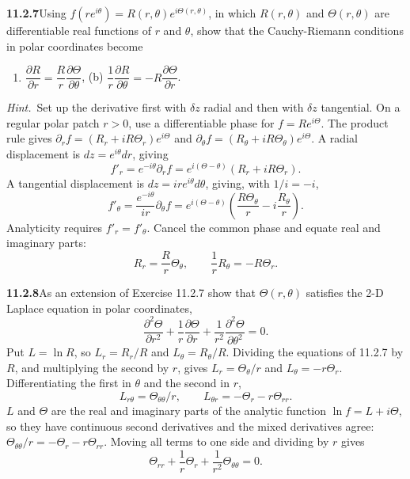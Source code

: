 \par\bigskip
\noindent\textbf{11.2.7}\quad Using $f(re^{i\theta})=R(r,\theta)e^{i\Theta(r,\theta)}$,
in which $R(r,\theta)$ and $\Theta(r,\theta)$ are differentiable real
functions of $r$ and $\theta$, show that the Cauchy-Riemann conditions in
polar coordinates become 
\begin{enumerate}
\item[(a)] $\dfrac{\partial R}{\partial r}
=\dfrac{R}{r}\dfrac{\partial\Theta}{\partial\theta}$,\qquad
(b) $\dfrac{1}{r}\dfrac{\partial R}{\partial\theta}
=-R\dfrac{\partial\Theta}{\partial r}$.
\end{enumerate}
\emph{Hint.}~Set up the derivative first with $\delta z$ radial and then with
$\delta z$ tangential.
\solution
On a regular polar patch $r>0$, use a differentiable phase for
$f=Re^{i\Theta}$. The product rule gives
$\partial_rf=(R_r+iR\Theta_r)e^{i\Theta}$ and
$\partial_\theta f=(R_\theta+iR\Theta_\theta)e^{i\Theta}$.
A radial displacement is $dz=e^{i\theta}dr$, giving
\[
f'_r=e^{-i\theta}\partial_r f
=e^{i(\Theta-\theta)}(R_r+iR\Theta_r).
\]
A tangential displacement is $dz=ir e^{i\theta}d\theta$, giving, with
$1/i=-i$,
\[
f'_\theta=\frac{e^{-i\theta}}{ir}\partial_\theta f
=e^{i(\Theta-\theta)}
\left(\frac{R\Theta_\theta}{r}-i\frac{R_\theta}{r}\right).
\]
Analyticity requires $f'_r=f'_\theta$.
Cancel the common phase and equate real and imaginary parts:
\[
\boxed{R_r=\frac Rr\Theta_\theta,\qquad
\frac1rR_\theta=-R\Theta_r}.
\]

\par\bigskip
\noindent\textbf{11.2.8}\quad As an extension of Exercise 11.2.7 show that
 $\Theta(r,\theta)$ satisfies the 2-D Laplace equation in polar coordinates,
\[
\frac{\partial^{2}\Theta}{\partial r^{2}}
+\frac{1}{r}\frac{\partial\Theta}{\partial r}
+\frac{1}{r^{2}}\frac{\partial^{2}\Theta}{\partial\theta^{2}}=0.
\]
\solution
{}
Put $L=\ln R$, so $L_r=R_r/R$ and $L_\theta=R_\theta/R$. Dividing the
equations of 11.2.7 by $R$, and multiplying the second by $r$, gives
$L_r=\Theta_\theta/r$ and $L_\theta=-r\Theta_r$.
Differentiating the first in $\theta$ and the second in $r$,
\[
L_{r\theta}=\Theta_{\theta\theta}/r,\qquad
L_{\theta r}=-\Theta_r-r\Theta_{rr}.
\]
$L$ and $\Theta$ are the real and imaginary parts of the analytic
function $\ln f=L+i\Theta$, so they have continuous second derivatives
and the mixed derivatives agree:
$\Theta_{\theta\theta}/r=-\Theta_r-r\Theta_{rr}$. Moving all terms to
one side and dividing by $r$ gives
\[
\boxed{\Theta_{rr}+\frac1r\Theta_r+
\frac1{r^2}\Theta_{\theta\theta}=0}.
\]

